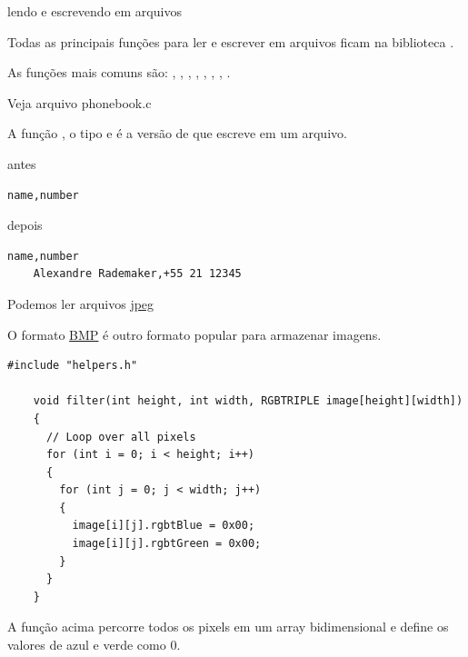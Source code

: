 \documentclass{beamer}
\begin{document}
\begin{frame}{lendo e escrevendo em arquivos}

  Todas as principais funções para ler e escrever em arquivos ficam na
  biblioteca .

  As funções mais comuns são: , ,
  , , , ,
  , .

  \framebreak

  Veja arquivo phonebook.c

  A função , o tipo  e  é a
  versão de  que escreve em um arquivo.

  \framebreak

  antes

  \begin{lstlisting}[style=code,caption=phonebook.csv,autogobble]
  name,number
  \end{lstlisting}

  depois

  \begin{lstlisting}[style=code,caption=phonebook.csv,autogobble]
    name,number
    Alexandre Rademaker,+55 21 12345
  \end{lstlisting}

  \framebreak

  Podemos ler arquivos \href{https://www.file-recovery.com/jpg-signature-format.htm}{jpeg}

  

  \framebreak

  O formato \href{https://en.wikipedia.org/wiki/BMP_file_format}{BMP}
  é outro formato popular para armazenar imagens. 

  \begin{lstlisting}[style=tinyc,autogobble,caption=filter]
    #include "helpers.h"
  
    void filter(int height, int width, RGBTRIPLE image[height][width])
    {
      // Loop over all pixels
      for (int i = 0; i < height; i++)
      {
        for (int j = 0; j < width; j++)
        {
          image[i][j].rgbtBlue = 0x00;
          image[i][j].rgbtGreen = 0x00;
        }
      }
    }
  \end{lstlisting}

  A função acima percorre todos os pixels em um array bidimensional
  e define os valores de azul e verde como 0.
  
\end{frame}
\end{document}

